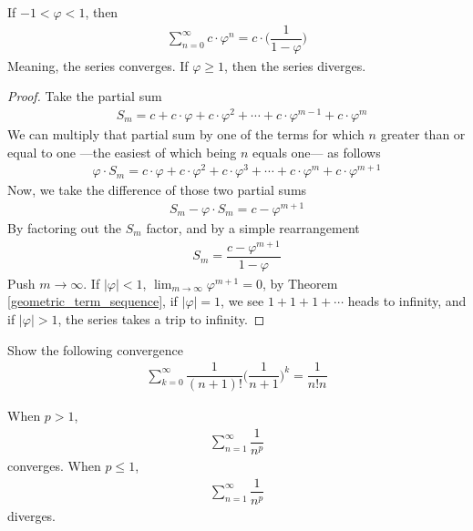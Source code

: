 \begin{theorem}
If $-1 < \varphi < 1$, then
\begin{align*}
    \sum_{n = 0}^{\infty} c \cdot \varphi^{n} = c \cdot \Big(\dfrac{1}{1 - \varphi}\Big)
\end{align*}
Meaning, the series converges. If $\varphi \geq 1$, then the series diverges.
\begin{proof}
Take the partial sum
\begin{align*}
    &S_{m} = c + c \cdot \varphi + c \cdot \varphi^{2} + \cdots + c \cdot \varphi^{m-1} + c \cdot \varphi^{m}
\end{align*}
We can multiply that partial sum by one of the terms for which $n$ greater than or equal to one ---the easiest of which being $n$ equals one--- as follows
\begin{align*}    
    \varphi \cdot S_{m} = c \cdot \varphi + c \cdot \varphi^{2} + c \cdot \varphi^{3} + \cdots + c \cdot \varphi^{m} + c \cdot \varphi^{m+1}
\end{align*}
Now, we take the difference of those two partial sums
\begin{align*}
    S_{m} - \varphi \cdot S_{m} = c - \varphi^{m+1}
\end{align*}
By factoring out the $S_{m}$ factor, and by a simple rearrangement
\begin{align*}
    S_{m} = \dfrac{c - \varphi^{m + 1}}{1 - \varphi}
\end{align*}
Push $m \longrightarrow \infty$. If $\lvert \varphi \rvert < 1$, $\lim_{m \longrightarrow \infty} \varphi^{m+1} = 0$, by Theorem \ref{geometric_term_sequence}, if $\lvert \varphi \rvert = 1$, we see $1 + 1 + 1 + \cdots$ heads to infinity, and if $\lvert \varphi \rvert > 1$, the series takes a trip to infinity. 
\end{proof}
\end{theorem}

\begin{exercise}
Show the following convergence
\begin{align*}
    \sum_{k=0}^{\infty} \dfrac{1}{(n+1)!} \Big(\dfrac{1}{n+1}\Big)^{k} = \dfrac{1}{n!n}
\end{align*}
\end{exercise}

\begin{theorem}
When $p > 1$, 
\begin{align*}
    \sum_{n = 1}^{\infty} \dfrac{1}{n^{p}}
\end{align*}
converges. When $p \leq 1$,
\begin{align*}
    \sum_{n = 1}^{\infty} \dfrac{1}{n^{p}}
\end{align*}
diverges.
\end{theorem}

